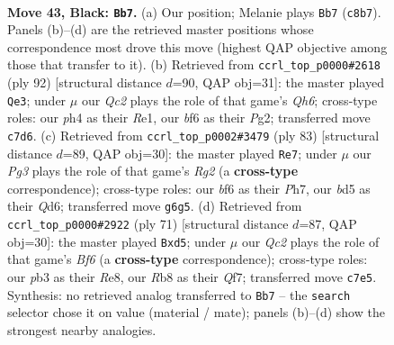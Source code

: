 \documentclass[11pt]{article}
\begin{document}
\clearpage

\begin{figure}[p]\centering
\begin{subfigure}{0.46\textwidth}\centering
\resizebox{\linewidth}{!}{%
\newchessgame
\chessboard[
  setfen={1rb2r2/R1q2p1k/1p3Bp1/3B4/7P/1P6/2PN1Q2/R5K1 b - - 0 43},
  showmover=false,
  pgfstyle=straightmove, color=movearrow, markmove={c8-b7}
]}
\caption{}
\end{subfigure}\hfill
\begin{subfigure}{0.46\textwidth}\centering
\resizebox{\linewidth}{!}{%
\newchessgame
\chessboard[
  setfen={2r2qk1/r4p2/4bPpQ/3pP3/1p6/3B3P/6P1/3RR2K w - - 1 47},
  showmover=false,
  pgfstyle=straightmove, color=movearrow, markmove={h6-e3}
]}
\caption{}
\end{subfigure}
\\[4pt]
\begin{subfigure}{0.46\textwidth}\centering
\resizebox{\linewidth}{!}{%
\newchessgame
\chessboard[
  setfen={7k/2b3rp/3q4/5p2/1r1pbP2/R2B2PP/4R2K/2Q2N2 b - - 1 42},
  showmover=false,
  pgfstyle=straightmove, color=movearrow, markmove={g7-e7}
]}
\caption{}
\end{subfigure}\hfill
\begin{subfigure}{0.46\textwidth}\centering
\resizebox{\linewidth}{!}{%
\newchessgame
\chessboard[
  setfen={4r2k/5qpp/5b2/NB1P4/P7/1P2rb2/K2R1Q1P/5R2 b - - 0 36},
  showmover=false,
  pgfstyle=straightmove, color=movearrow, markmove={f3-d5}
]}
\caption{}
\end{subfigure}
\caption{\textbf{Move 43, Black: \texttt{Bb7}.} (a) Our position; Melanie plays \texttt{Bb7} (\texttt{c8b7}). Panels (b)--(d) are the retrieved master positions whose correspondence most drove this move (highest QAP objective among those that transfer to it). (b) Retrieved from \texttt{ccrl\_top\_p0000\#2618} (ply 92) [structural distance $d$=90, QAP obj=31]: the master played \texttt{Qe3}; under $\mu$ our \emph{Qc2} plays the role of that game's \emph{Qh6}; cross-type roles: our \emph{p}h4 as their \emph{R}e1, our \emph{b}f6 as their \emph{P}g2; transferred move \texttt{c7d6}. (c) Retrieved from \texttt{ccrl\_top\_p0002\#3479} (ply 83) [structural distance $d$=89, QAP obj=30]: the master played \texttt{Re7}; under $\mu$ our \emph{Pg3} plays the role of that game's \emph{Rg2} (a \textbf{cross-type} correspondence); cross-type roles: our \emph{b}f6 as their \emph{P}h7, our \emph{b}d5 as their \emph{Q}d6; transferred move \texttt{g6g5}. (d) Retrieved from \texttt{ccrl\_top\_p0000\#2922} (ply 71) [structural distance $d$=87, QAP obj=30]: the master played \texttt{Bxd5}; under $\mu$ our \emph{Qc2} plays the role of that game's \emph{Bf6} (a \textbf{cross-type} correspondence); cross-type roles: our \emph{p}b3 as their \emph{R}e8, our \emph{R}b8 as their \emph{Q}f7; transferred move \texttt{c7e5}. Synthesis: no retrieved analog transferred to \texttt{Bb7} -- the \texttt{search} selector chose it on value (material / mate); panels (b)--(d) show the strongest nearby analogies.}
\label{fig:thought-m85}
\end{figure}
\end{document}
